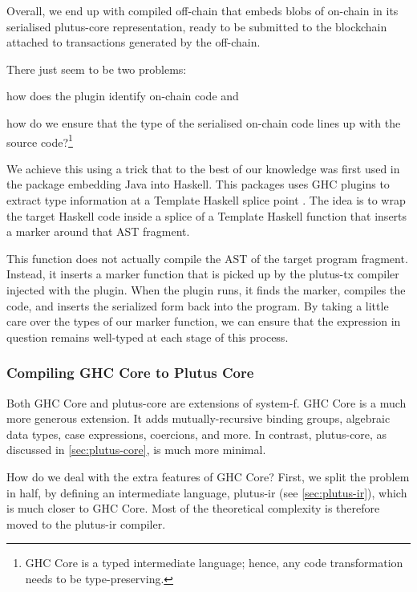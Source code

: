 Overall, we end up with compiled \gls{off-chain} that embeds blobs of \gls{on-chain} in its serialised \gls{plutus-core} representation, ready to be submitted to the blockchain attached to transactions generated by the \gls{off-chain}.

There just seem to be two problems:
\begin{inparaenum}
\item how does the plugin identify on-chain code and
\item how do we ensure that the type of the serialised on-chain code lines up with the source code?\footnote{
GHC Core is a typed intermediate language; hence, any code transformation needs to be type-preserving.
}
\end{inparaenum}
We achieve this using a trick that to the best of our knowledge was first used in the  package embedding Java into Haskell.
This packages uses GHC plugins to extract type information at a Template Haskell splice point \autocite{inline-java-blog-post}.
The idea is to wrap the target Haskell code inside a splice of a Template Haskell function that inserts a marker around that AST fragment.

This function does not actually compile the AST of the target program fragment.
Instead, it inserts a marker function that is picked up by the \gls{plutus-tx} compiler injected with the plugin.
When the plugin runs, it finds the marker, compiles the code, and inserts the serialized form back into the program.
By taking a little care over the types of our marker function, we can ensure that the expression in question remains well-typed at each stage of this process.

\subsubsection{Compiling GHC Core to Plutus Core}

Both GHC Core and \gls{plutus-core} are extensions of \gls{system-f}.
GHC Core is a much more generous extension.
It adds mutually-recursive binding groups, algebraic data types, case expressions, coercions, and more.
In contrast, \gls{plutus-core}, as discussed in \cref{sec:plutus-core}, is much more minimal.

How do we deal with the extra features of GHC Core?
First, we split the problem in half, by defining an intermediate language, \gls{plutus-ir} (see \cref{sec:plutus-ir}), which is much closer to GHC Core.
Most of the theoretical complexity is therefore moved to the \gls{plutus-ir} compiler.


